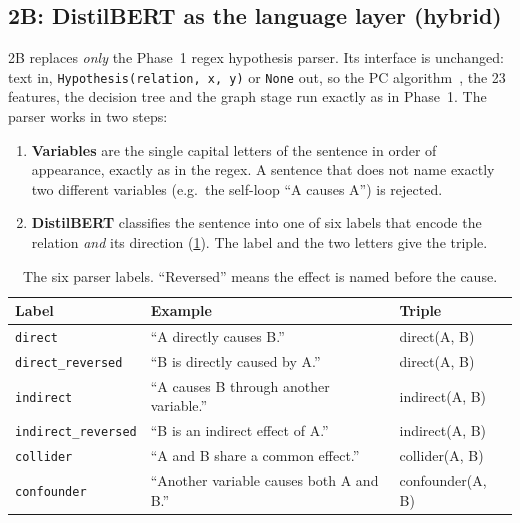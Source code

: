 \documentclass[12pt,a4paper]{article}
\newcommand{\thead}[1]{\textbf{#1}}
\newcommand{\code}[1]{\texttt{#1}}
\begin{document}
\subsection{2B: DistilBERT as the language layer (hybrid)}\label{sec:arch2b}
2B replaces \emph{only} the Phase~1 regex hypothesis parser. Its interface is unchanged: text in,
\code{Hypothesis(relation, x, y)} or \code{None} out, so the PC algorithm~\cite{spirtes2000}, the 23 features, the decision
tree and the graph stage run exactly as in Phase~1. The parser works in two steps:
\begin{enumerate}
  \item \textbf{Variables} are the single capital letters of the sentence in order of appearance, exactly as in the regex. A
        sentence that does not name exactly two different variables (e.g.\ the self-loop ``A causes A'') is rejected.
  \item \textbf{DistilBERT} classifies the sentence into one of six labels that encode the relation \emph{and} its direction
        (\cref{tab:labels}). The label and the two letters give the triple.
\end{enumerate}

\begin{table}[!htbp]
\centering\small
\caption{The six parser labels. ``Reversed'' means the effect is named before the cause.}
\label{tab:labels}
\begin{tabular}{@{}lll@{}}
\toprule
\thead{Label} & \thead{Example} & \thead{Triple} \\
\midrule
\code{direct}                & ``A directly causes B.''                & direct(A, B) \\
\rowcolor{rowtint} \code{direct\_reversed} & ``B is directly caused by A.''   & direct(A, B) \\
\code{indirect}              & ``A causes B through another variable.'' & indirect(A, B) \\
\rowcolor{rowtint} \code{indirect\_reversed} & ``B is an indirect effect of A.''  & indirect(A, B) \\
\code{collider}              & ``A and B share a common effect.''      & collider(A, B) \\
\rowcolor{rowtint} \code{confounder} & ``Another variable causes both A and B.'' & confounder(A, B) \\
\bottomrule
\end{tabular}
\end{table}
\end{document}
